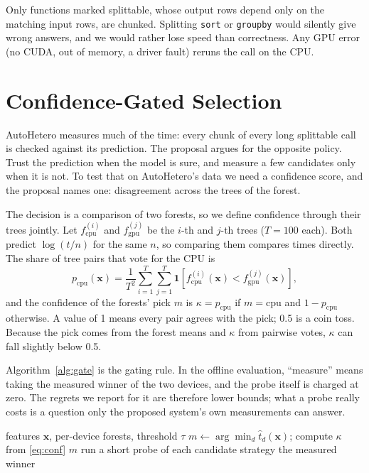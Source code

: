 \documentclass[conference]{IEEEtran}
\begin{document}
Only functions marked splittable, whose output rows depend only on the matching input rows, are chunked. Splitting \texttt{sort} or \texttt{groupby} would silently give wrong answers, and we would rather lose speed than correctness. Any GPU error (no CUDA, out of memory, a driver fault) reruns the call on the CPU.

\section{Confidence-Gated Selection}
\label{sec:confidence}

AutoHetero measures much of the time: every chunk of every long splittable call is checked against its prediction. The proposal argues for the opposite policy. Trust the prediction when the model is sure, and measure a few candidates only when it is not. To test that on AutoHetero's data we need a confidence score, and the proposal names one: disagreement across the trees of the forest.

The decision is a comparison of two forests, so we define confidence through their trees jointly. Let $f^{(i)}_{\mathrm{cpu}}$ and $f^{(j)}_{\mathrm{gpu}}$ be the $i$-th and $j$-th trees ($T = 100$ each). Both predict $\log(t/n)$ for the same $n$, so comparing them compares times directly. The share of tree pairs that vote for the CPU is
\begin{equation}
p_{\mathrm{cpu}}(\mathbf{x}) = \frac{1}{T^2}\sum_{i=1}^{T}\sum_{j=1}^{T} \mathbf{1}\!\left[f^{(i)}_{\mathrm{cpu}}(\mathbf{x}) < f^{(j)}_{\mathrm{gpu}}(\mathbf{x})\right],
\label{eq:conf}
\end{equation}
and the confidence of the forests' pick $m$ is $\kappa = p_{\mathrm{cpu}}$ if $m = \mathrm{cpu}$ and $1 - p_{\mathrm{cpu}}$ otherwise. A value of 1 means every pair agrees with the pick; 0.5 is a coin toss. Because the pick comes from the forest means and $\kappa$ from pairwise votes, $\kappa$ can fall slightly below 0.5.

Algorithm~\ref{alg:gate} is the gating rule. In the offline evaluation, ``measure'' means taking the measured winner of the two devices, and the probe itself is charged at zero. The regrets we report for it are therefore lower bounds; what a probe really costs is a question only the proposed system's own measurements can answer.

\begin{algorithm}[t]
\caption{Confidence-gated strategy selection (evaluated offline)}
\label{alg:gate}
\begin{algorithmic}[1]
\Require features $\mathbf{x}$, per-device forests, threshold $\tau$
\State $m \gets \arg\min_d \hat t_d(\mathbf{x})$; compute $\kappa$ from \eqref{eq:conf}
\If{$\kappa \ge \tau$}
  \State \Return $m$ 
\Else
  \State run a short probe of each candidate strategy
  \State \Return the measured winner 
\EndIf
\end{algorithmic}
\end{algorithm}
\end{document}
